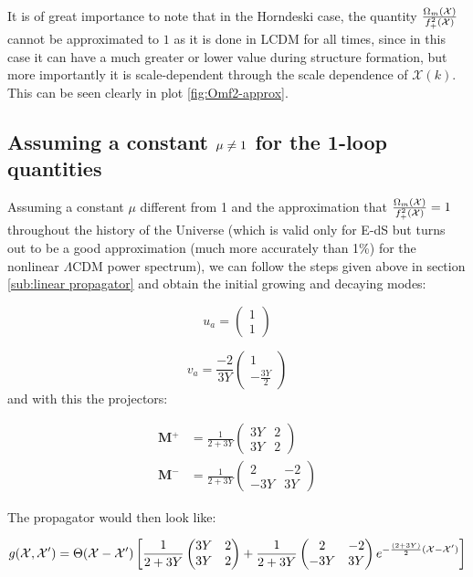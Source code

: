It is of great importance to note that in the Horndeski case, the
quantity $\frac{\Omega_{m}(\mathcal{X})}{f_{+}^{2}(\mathcal{X})}$ cannot be
approximated to $1$ as it is done in LCDM for all times, since in
this case it can have a much greater or lower value during structure
formation, but more importantly it is scale-dependent through the
scale dependence of $\mathcal{X}(k)$. This can be seen clearly in
plot \ref{fig:Omf2-approx}.


\subsection{Assuming a constant $\mu\protect\neq1$ for the 1-loop quantities}

Assuming a constant $\mu$ different from 1 and the approximation
that $\frac{\Omega_{m}(\mathcal{X})}{f_{+}^{2}(\mathcal{X})}=1$ throughout
the history of the Universe (which is valid only for E-dS but turns
out to be a good approximation (much more accurately than 1\%) for
the nonlinear $\Lambda\textrm{CDM}$ power spectrum), we can follow
the steps given above in section \ref{sub:linear propagator} and
obtain the initial growing and decaying modes:

\[
u_{a}=\begin{pmatrix}1\\
1
\end{pmatrix}
\]


\[
v_{a}=\frac{-2}{3Y}\begin{pmatrix}1\\
-\frac{3Y}{2}
\end{pmatrix}
\]
and with this the projectors:

\begin{align*}
\mathrm{\mathbf{M}}{}^{+} & =\frac{1}{2+3Y}\begin{pmatrix}3Y & 2\\
3Y & 2
\end{pmatrix}\\
\mathbf{\mathrm{\mathbf{M}}}^{-} & =\frac{1}{2+3Y}\begin{pmatrix}2 & -2\\
-3Y & 3Y
\end{pmatrix}
\end{align*}


The propagator would then look like:

\begin{equation}
g(\mathcal{X},\mathcal{X}')=\Theta(\mathcal{X}-\mathcal{X}')\left[\frac{1}{2+3Y}\begin{pmatrix}3Y & 2\\
3Y & 2
\end{pmatrix}+\frac{1}{2+3Y}\begin{pmatrix}2 & -2\\
-3Y & 3Y
\end{pmatrix}e^{-\frac{(2+3Y)}{2}(\mathcal{X}-\mathcal{X}')}\right]\label{eq:ghorn}
\end{equation}



